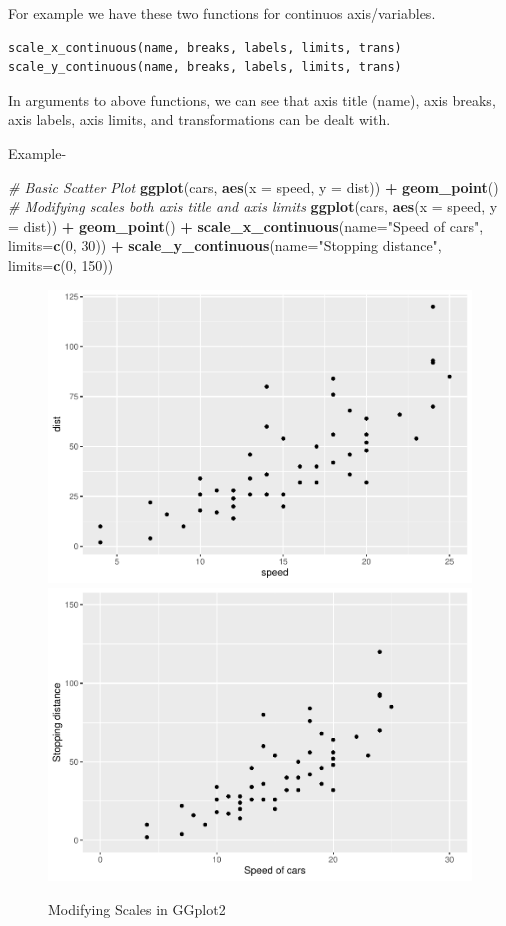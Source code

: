 \documentclass[
]{book}
\newenvironment{Shaded}{\begin{snugshade}}{\end{snugshade}}
\newcommand{\AttributeTok}[1]{\textcolor[rgb]{0.13,0.29,0.53}{#1}}
\newcommand{\CommentTok}[1]{\textcolor[rgb]{0.56,0.35,0.01}{\textit{#1}}}
\newcommand{\DecValTok}[1]{\textcolor[rgb]{0.00,0.00,0.81}{#1}}
\newcommand{\FunctionTok}[1]{\textcolor[rgb]{0.13,0.29,0.53}{\textbf{#1}}}
\newcommand{\NormalTok}[1]{#1}
\newcommand{\SpecialCharTok}[1]{\textcolor[rgb]{0.81,0.36,0.00}{\textbf{#1}}}
\newcommand{\StringTok}[1]{\textcolor[rgb]{0.31,0.60,0.02}{#1}}
\begin{document}
For example we have these two functions for continuos axis/variables.

\begin{verbatim}
scale_x_continuous(name, breaks, labels, limits, trans)
scale_y_continuous(name, breaks, labels, limits, trans)
\end{verbatim}

In arguments to above functions, we can see that axis title (name), axis breaks, axis labels, axis limits, and transformations can be dealt with.

Example-

\begin{Shaded}
\begin{Highlighting}[]
\CommentTok{\# Basic Scatter Plot}
\FunctionTok{ggplot}\NormalTok{(cars, }\FunctionTok{aes}\NormalTok{(}\AttributeTok{x =}\NormalTok{ speed, }\AttributeTok{y =}\NormalTok{ dist)) }\SpecialCharTok{+} 
  \FunctionTok{geom\_point}\NormalTok{()}
\CommentTok{\# Modifying scales both axis title and axis limits}
\FunctionTok{ggplot}\NormalTok{(cars, }\FunctionTok{aes}\NormalTok{(}\AttributeTok{x =}\NormalTok{ speed, }\AttributeTok{y =}\NormalTok{ dist)) }\SpecialCharTok{+} 
  \FunctionTok{geom\_point}\NormalTok{() }\SpecialCharTok{+} 
  \FunctionTok{scale\_x\_continuous}\NormalTok{(}\AttributeTok{name=}\StringTok{"Speed of cars"}\NormalTok{, }\AttributeTok{limits=}\FunctionTok{c}\NormalTok{(}\DecValTok{0}\NormalTok{, }\DecValTok{30}\NormalTok{)) }\SpecialCharTok{+}
  \FunctionTok{scale\_y\_continuous}\NormalTok{(}\AttributeTok{name=}\StringTok{"Stopping distance"}\NormalTok{, }\AttributeTok{limits=}\FunctionTok{c}\NormalTok{(}\DecValTok{0}\NormalTok{, }\DecValTok{150}\NormalTok{))}
\end{Highlighting}
\end{Shaded}

\begin{figure}

{\centering \includegraphics[width=0.49\linewidth]{DauR_files/figure-latex/scale1-1} \includegraphics[width=0.49\linewidth]{DauR_files/figure-latex/scale1-2} 

}

\caption{Modifying Scales in GGplot2}\label{fig:scale1}
\end{figure}
\end{document}
